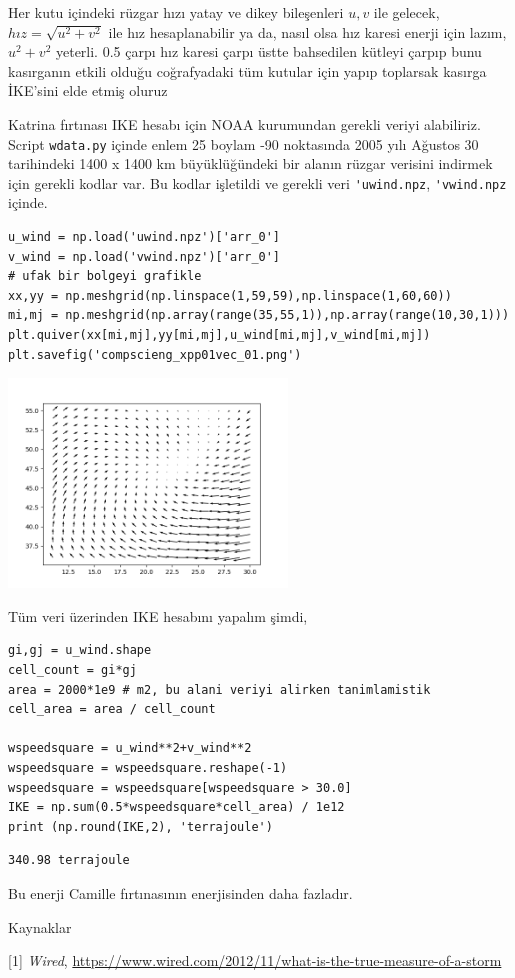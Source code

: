 \documentclass[12pt,fleqn]{article}\usepackage{../../common}
\begin{document}
Her kutu içindeki rüzgar hızı yatay ve dikey bileşenleri $u,v$ ile gelecek, $hız
= \sqrt{u^2+v^2}$ ile hız hesaplanabilir ya da, nasıl olsa hız karesi enerji
için lazım, $u^2+v^2$ yeterli. 0.5 çarpı hız karesi çarpı üstte bahsedilen
kütleyi çarpıp bunu kasırganın etkili olduğu coğrafyadaki tüm kutular için
yapıp toplarsak kasırga İKE'sini elde etmiş oluruz 

Katrina fırtınası IKE hesabı için NOAA kurumundan gerekli veriyi alabiliriz.
Script \verb!wdata.py! içinde enlem 25 boylam -90 noktasında 2005 yılı Ağustos
30 tarihindeki 1400 x 1400 km büyüklüğündeki bir alanın rüzgar verisini indirmek
için gerekli kodlar var. Bu kodlar işletildi ve gerekli veri \verb!'uwind.npz!,
\verb!'vwind.npz! içinde.

\begin{verbatim}
u_wind = np.load('uwind.npz')['arr_0']
v_wind = np.load('vwind.npz')['arr_0']
# ufak bir bolgeyi grafikle
xx,yy = np.meshgrid(np.linspace(1,59,59),np.linspace(1,60,60))
mi,mj = np.meshgrid(np.array(range(35,55,1)),np.array(range(10,30,1)))
plt.quiver(xx[mi,mj],yy[mi,mj],u_wind[mi,mj],v_wind[mi,mj])
plt.savefig('compscieng_xpp01vec_01.png')
\end{verbatim}

\includegraphics[width=20em]{compscieng_xpp01vec_01.png}

Tüm veri üzerinden IKE hesabını yapalım şimdi,

\begin{verbatim}
gi,gj = u_wind.shape
cell_count = gi*gj
area = 2000*1e9 # m2, bu alani veriyi alirken tanimlamistik
cell_area = area / cell_count

wspeedsquare = u_wind**2+v_wind**2
wspeedsquare = wspeedsquare.reshape(-1)
wspeedsquare = wspeedsquare[wspeedsquare > 30.0]
IKE = np.sum(0.5*wspeedsquare*cell_area) / 1e12
print (np.round(IKE,2), 'terrajoule')
\end{verbatim}

\begin{verbatim}
340.98 terrajoule
\end{verbatim}

Bu enerji Camille fırtınasının enerjisinden daha fazladır. 


Kaynaklar

[1] {\em Wired}, \url{https://www.wired.com/2012/11/what-is-the-true-measure-of-a-storm}
\end{document}
